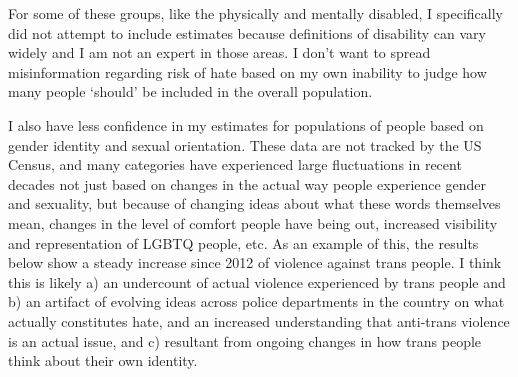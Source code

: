 \documentclass[
]{article}
\begin{document}
For some of these groups, like the physically and mentally disabled, I
specifically did not attempt to include estimates because definitions of
disability can vary widely and I am not an expert in those areas. I
don't want to spread misinformation regarding risk of hate based on my
own inability to judge how many people `should' be included in the
overall population.

I also have less confidence in my estimates for populations of people
based on gender identity and sexual orientation. These data are not
tracked by the US Census, and many categories have experienced large
fluctuations in recent decades not just based on changes in the actual
way people experience gender and sexuality, but because of changing
ideas about what these words themselves mean, changes in the level of
comfort people have being out, increased visibility and representation
of LGBTQ people, etc. As an example of this, the results below show a
steady increase since 2012 of violence against trans people. I think
this is likely a) an undercount of actual violence experienced by trans
people and b) an artifact of evolving ideas across police departments in
the country on what actually constitutes hate, and an increased
understanding that anti-trans violence is an actual issue, and c)
resultant from ongoing changes in how trans people think about their own
identity.
\end{document}
